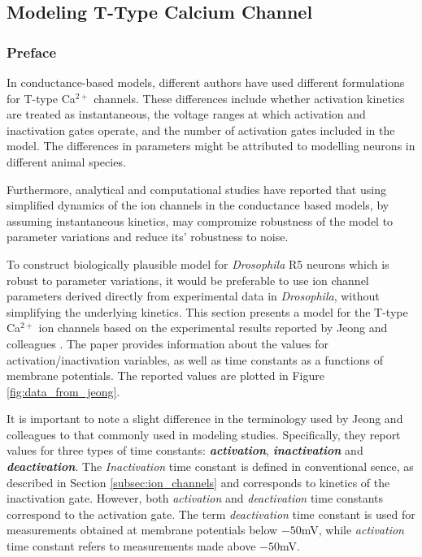 \documentclass[../main.tex]{subfiles}
\begin{document}
\subsection{Modeling T-Type Calcium Channel} \label{sec:modeling_t_type_channel}

\subsubsection{Preface} \label{subsec:model_t_type_preface}

In conductance-based models, different authors have used different formulations for T-type Ca$^{2+}$ channels. These differences include whether activation kinetics are treated as instantaneous, the voltage ranges at which activation and inactivation gates operate, and the number of activation gates included in the model. The differences in parameters might be attributed to modelling neurons in different animal species.

Furthermore, analytical and computational studies have reported that using simplified dynamics of the ion channels in the conductance based models, by assuming instantaneous kinetics, may compromize robustness of the model to parameter variations and reduce its' robustness to noise. %

To construct biologically plausible model for \textit{Drosophila} R5 neurons which is robust to parameter variations, it would be preferable to use ion channel parameters derived directly from experimental data in \textit{Drosophila}, without simplifying the underlying kinetics.
This section presents a model for the T-type Ca$^{2+}$ ion channels based on the experimental results reported by Jeong and colleagues \parencite{jeongCaa1TFlyTtype2015}. The paper provides
information about the values for activation/inactivation variables, as well as time constants
as a functions of membrane potentials. The reported values are plotted in Figure \ref{fig:data_from_jeong}.

It is important to note a slight difference in the terminology used by Jeong and colleagues to that commonly used in modeling studies. Specifically, they report values for three types of time constants: \textbf{\textit{activation}}, \textbf{\textit{inactivation}} and \textbf{\textit{deactivation}}. The \textit{Inactivation} time constant is defined in conventional sence, as described in Section \ref{subsec:ion_channels} and corresponds to kinetics of the inactivation gate. However, both \textit{activation} and \textit{deactivation} time constants correspond to the activation gate. The term \textit{deactivation} time constant is used for measurements obtained at membrane potentials below $-50$mV, while \textit{activation} time constant refers to measurements made above $-50$mV.
\end{document}
